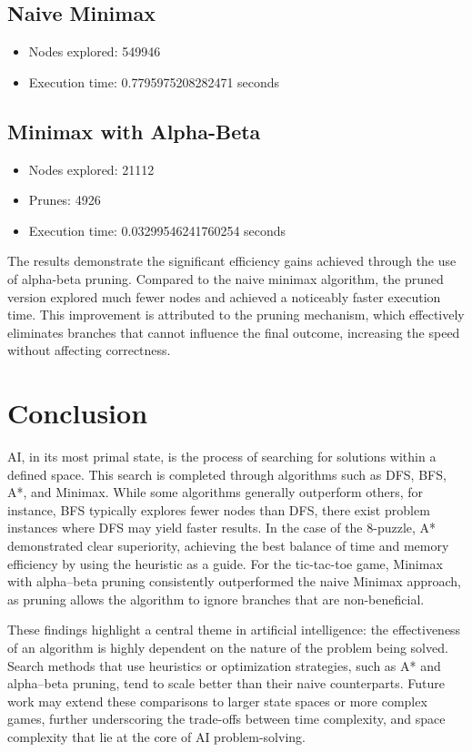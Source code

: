 \documentclass[journal]{./IEEE/IEEEtran}
\begin{document}
\subsection{Naive Minimax}
\begin{itemize}
    \item Nodes explored: 549946
    \item Execution time: 0.7795975208282471 seconds
\end{itemize}

\subsection{Minimax with Alpha-Beta}
\begin{itemize}
    \item Nodes explored: 21112
    \item Prunes: 4926
    \item Execution time: 0.03299546241760254 seconds
\end{itemize}
 
The results demonstrate the significant efficiency gains achieved through the use of alpha-beta pruning. Compared to the naive minimax algorithm, the pruned version explored much fewer nodes and achieved a noticeably faster execution time. This improvement is attributed to the pruning mechanism, which effectively eliminates branches that cannot influence the final outcome, increasing the speed without affecting correctness.

\section{Conclusion}
AI, in its most primal state, is the process of searching for solutions within a defined space. 
This search is completed through algorithms such as DFS, BFS, A*, and Minimax. While some 
algorithms generally outperform others, for instance, BFS typically explores fewer nodes than DFS, there 
exist problem instances where DFS may yield faster results. In the case of the 8-puzzle, A* 
demonstrated clear superiority, achieving the best balance of time and memory efficiency by using the
heuristic as a guide. For the tic-tac-toe game, Minimax with alpha–beta pruning consistently outperformed 
the naive Minimax approach, as pruning allows the algorithm to ignore branches that are non-beneficial.  

These findings highlight a central theme in artificial intelligence: the effectiveness of an algorithm 
is highly dependent on the nature of the problem being solved. Search methods that use 
heuristics or optimization strategies, such as A* and alpha–beta pruning, tend to scale better 
than their naive counterparts. Future work may extend these comparisons to larger state spaces or more 
complex games, further underscoring the trade-offs between time complexity,  and space complexity that lie 
at the core of AI problem-solving.
\end{document}
